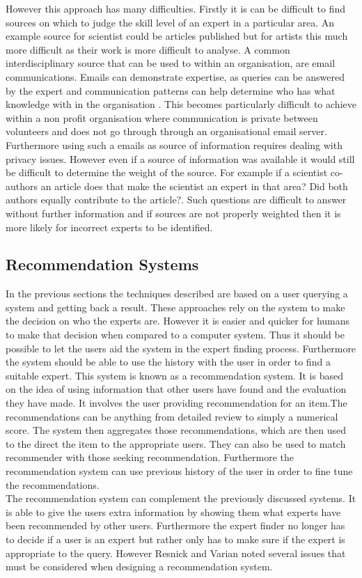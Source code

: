 \documentclass[a4paper,oneside,11pt]{report}
\begin{document}
However this approach has many difficulties. Firstly it is can be difficult to find sources on which to judge the skill level of an expert in a particular area. An example source for scientist could be articles published but for artists this much more difficult as their work is more difficult to analyse. A common interdisciplinary source that can be used to within an organisation, are email communications. Emails can demonstrate expertise, as queries can be answered by the expert and communication patterns can help determine who has what knowledge with in the organisation \autocite{campbell2003}. This becomes particularly difficult to achieve within a non profit organisation where communication is private between volunteers and does not go through through an organisational email server. Furthermore using such a emails as source of information requires dealing with privacy issues.
However even if a source of information was available it would still be difficult to determine the weight of the source. For example if a scientist co-authors an article does that make the scientist an expert in that area? Did both authors equally contribute to the article?. Such questions are difficult to answer without further information and if sources are not properly weighted then it is more likely for incorrect experts to be identified.

\subsection{Recommendation Systems}
In the previous sections the techniques described are based on a user querying a system and getting back a result. These approaches rely on the system to make the decision on who the experts are. However it is easier and quicker for humans to make that decision when compared to a computer system. Thus it should be possible to let the users aid the system in the expert finding process. Furthermore the system should be able to use the history with the user in order to find a suitable expert. This system is known as a recommendation system. It is based on the idea of using information that other users have found and the evaluation they have made. It involves the user providing recommendation for an item.The recommendations can be anything from detailed review to simply a numerical score. The system then aggregates those recommendations, which are then used to the direct the item to the appropriate users. They can also be used to match recommender with those seeking recommendation. Furthermore the recommendation system can use previous history of the user in order to fine tune the recommendations.
\\ 
The recommendation system can complement the previously discussed systems. It is able to give the users extra information by showing them what experts have been recommended by other users. Furthermore the expert finder no longer has to decide if a user is an expert but rather only has to make sure if the expert is appropriate to the query.  However Resnick and Varian \autocite{resnick} noted several issues that must be considered when designing a recommendation system.
\end{document}
